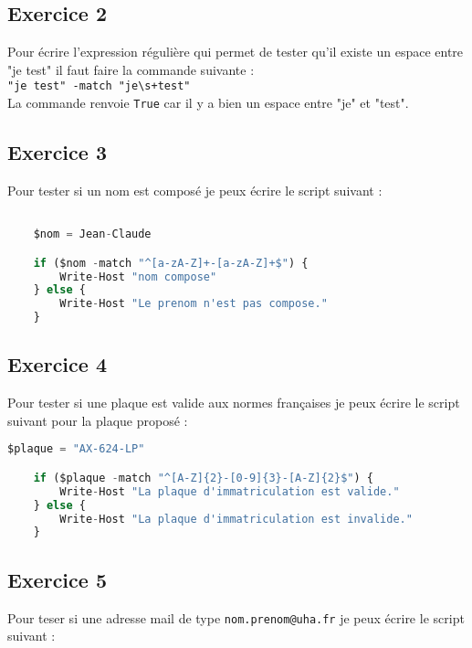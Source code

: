 \documentclass[12pt, a4paper]{article}
\begin{document}
\subsection{Exercice 2}
Pour écrire l’expression régulière qui permet de tester qu’il existe un espace entre "je test"
il faut faire la commande suivante :\\

\texttt{"je test" -match "je\textbackslash s+test"}\\

La commande renvoie \texttt{True} car il y a bien un espace entre "je" et "test".\\

\newpage
\subsection{Exercice 3}
Pour tester si un nom est composé je peux écrire le script suivant :\\

\begin{lstlisting}[language=Python]

    $nom = Jean-Claude

    if ($nom -match "^[a-zA-Z]+-[a-zA-Z]+$") {
        Write-Host "nom compose"
    } else {
        Write-Host "Le prenom n'est pas compose."
    }

\end{lstlisting}


\subsection{Exercice 4}
Pour tester si une plaque est valide aux normes françaises je peux écrire le script
suivant pour la plaque proposé :\\

\begin{lstlisting}[language=Python]
    $plaque = "AX-624-LP"

    if ($plaque -match "^[A-Z]{2}-[0-9]{3}-[A-Z]{2}$") {
        Write-Host "La plaque d'immatriculation est valide."
    } else {
        Write-Host "La plaque d'immatriculation est invalide."
    }
\end{lstlisting}

\subsection{Exercice 5}

Pour teser si une adresse mail de type \texttt{nom.prenom@uha.fr} je peux écrire le script suivant :
\end{document}
